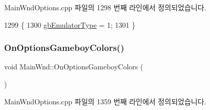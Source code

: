 Main\+Wnd\+Options.\+cpp 파일의 1298 번째 라인에서 정의되었습니다.


\begin{DoxyCode}
1299 \{
1300   \mbox{\hyperlink{gb_globals_8cpp_aab449ed6ecf2bd502928a3d5aa5c54c4}{gbEmulatorType}} = 1;
1301 \}
\end{DoxyCode}
\mbox{\label{class_main_wnd_a26f32c1e841c679d112a15f00db1d9b2}} 
\subsubsection{\texorpdfstring{On\+Options\+Gameboy\+Colors()}{OnOptionsGameboyColors()}}
{\footnotesize\ttfamily void Main\+Wnd\+::\+On\+Options\+Gameboy\+Colors (\begin{DoxyParamCaption}{ }\end{DoxyParamCaption})\hspace{0.3cm}{\ttfamily [protected]}}



Main\+Wnd\+Options.\+cpp 파일의 1359 번째 라인에서 정의되었습니다.


